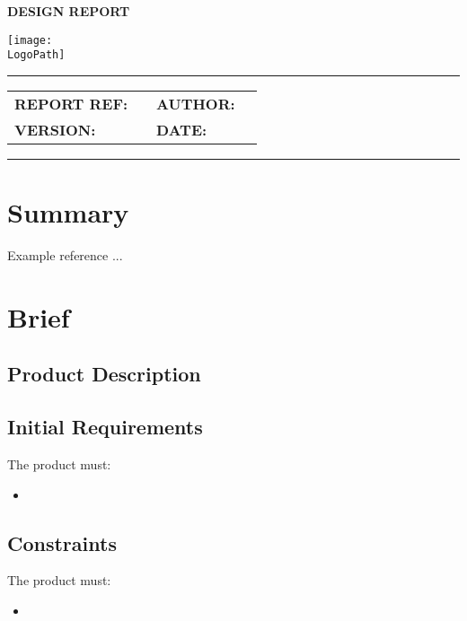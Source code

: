 \documentclass[10pt]{article}
\makeatletter
\newcommand{\customtitle}{%
  \noindent
  \begin{minipage}[t]{0.65\textwidth}
    \vspace{-0.5cm}
    {\ocrfamily\Large\bfseries DESIGN REPORT \par} %
  \end{minipage}%
  \begin{minipage}[t]{0.35\textwidth}
    \flushright{}
    \texttt{[image: \\LogoPath]}
  \end{minipage}

  \vspace{0.3cm}
  \hrule height 0.8pt
  \vspace{0.3cm}

  {\ocrfamily\bfseries\ProjectFullRef\par}
  {\ocrfamily\large\bfseries\ReportTitle\par}

  \vspace{0.5em}

  \begin{tabular}{@{}ll@{\hspace{2cm}}ll@{}}
    \ocrfamily\textbf{REPORT REF:} & \ocrfamily \ReportRef &
    \ocrfamily\textbf{AUTHOR:}     & \ocrfamily \AuthorName \\

    \ocrfamily\textbf{VERSION:}    & \ocrfamily \DocVersion &
    \ocrfamily\textbf{DATE:}       & \ocrfamily \ReleaseDate \\
  \end{tabular}

  \vspace{0.3cm}
  \hrule height 0.8pt
  \vspace{0.25cm}
}
\makeatother
\begin{document}
\vspace*{-1cm}
\thispagestyle{plain}
\customtitle{}


\section{Summary}

Example reference \cite{hibbeler2016mechanics}...

\section{Brief}

\subsection{Product Description}

\subsection{Initial Requirements}
The product must:
\begin{itemize}[leftmargin=*] %
	\item %
\end{itemize}

\subsection{Constraints}
The product must:
\begin{itemize}[leftmargin=*] %
	\item %
\end{itemize}
\end{document}

